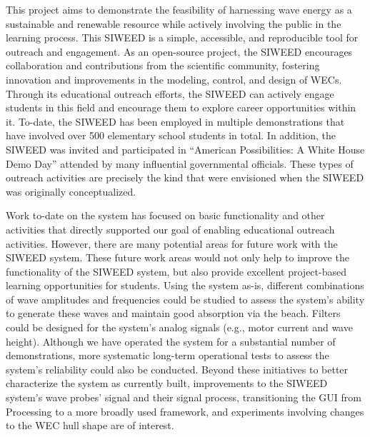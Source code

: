 \documentclass[hardware,article,submit,pdftex,moreauthors]{Definitions/mdpi}
\begin{document}
This project aims to demonstrate the feasibility of harnessing wave energy as a sustainable and renewable resource while actively involving the public in the learning process.
This SIWEED is a simple, accessible, and reproducible tool for outreach and engagement.
As an open-source project, the SIWEED encourages collaboration and contributions from the scientific community, fostering innovation and improvements in the modeling, control, and design of WECs.
Through its educational outreach efforts, the SIWEED can actively engage students in this field and encourage them to explore career opportunities within it.
To-date, the SIWEED has been employed in multiple demonstrations that have involved over 500 elementary school students in total.
In addition, the SIWEED was invited and participated in ``American Possibilities: A White House Demo Day'' attended by many influential governmental officials.
These types of outreach activities are precisely the kind that were envisioned when the SIWEED was originally conceptualized.

Work to-date on the system has focused on basic functionality and other activities that directly supported our goal of enabling educational outreach activities.
However, there are many potential areas for future work with the SIWEED system.
These future work areas would not only help to improve the functionality of the SIWEED system, but also provide excellent project-based learning opportunities for students.
Using the system as-is, different combinations of wave amplitudes and frequencies could be studied to assess the system's ability to generate these waves and maintain good absorption via the beach.
Filters could be designed for the system's analog signals (e.g., motor current and wave height).
Although we have operated the system for a substantial number of demonstrations, more systematic long-term operational tests to assess the system's reliability could also be conducted.
Beyond these initiatives to better characterize the system as currently built, improvements to the SIWEED system's wave probes' signal and their signal process, transitioning the GUI from Processing to a more broadly used framework, and experiments involving changes to the WEC hull shape are of interest.
\end{document}
